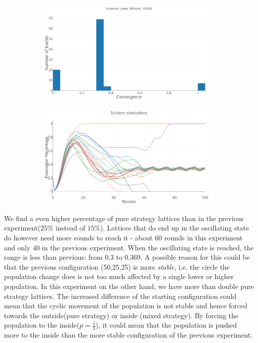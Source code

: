 \documentclass[a4paper, 11pt]{article}
\begin{document}
\begin{figure}[H]
	\begin{subfigure}{0.52\textwidth}
		\includegraphics[width=1\linewidth]{50x50_60RockDist_ScissorsHG}
	\end{subfigure}%
	\begin{subfigure}{0.52\textwidth}
		\includegraphics[width=1\linewidth]{50x50_60RockDist_IndividualScissors}
	\end{subfigure}
\end{figure}

	
	We find a even higher percentage of pure strategy lattices than in the previous experiment($25\%$ instead of $15\%$). Lattices that do end up in the oscillating state do however need more rounds to reach it - about 60 rounds in this experiment and only 40 in the previous experiment. When the oscillating state is reached, the range is less than previous: from $0.3$ to $0.369$. A possible reason for this could be that the previous configuration (50,25,25) is more \textit{stable}, i.e. the circle the population change does is not too much affected by a single lower or higher population. In this experiment on the other hand, we have more than double pure strategy lattices. The increased difference of the starting configuration could mean that the cyclic movement of the population is not stable and hence forced towards the outside(pure strategy) or inside (mixed strategy). By forcing the population to the inside($p = \frac{1}{3}$), it could mean that the population is pushed more to the inside than the more stable configuration of the previous experiment.
\end{document}
